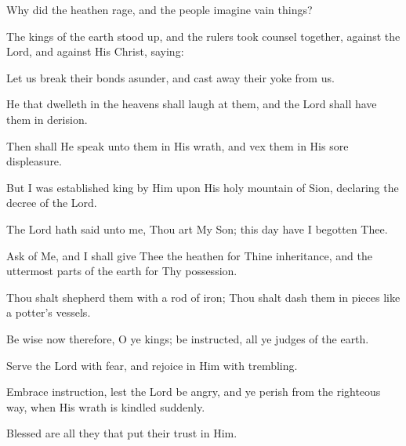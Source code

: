 Why did the heathen rage, and the people imagine vain things?

The kings of the earth stood up, and the rulers took counsel together, against the Lord, and against His Christ, saying:

Let us break their bonds asunder, and cast away their yoke from us.

He that dwelleth in the heavens shall laugh at them, and the Lord shall have them in derision.

Then shall He speak unto them in His wrath, and vex them in His sore displeasure.

But I was established king by Him upon His holy mountain of Sion, declaring the decree of the Lord.

The Lord hath said unto me, Thou art My Son; this day have I begotten Thee.

Ask of Me, and I shall give Thee the heathen for Thine inheritance, and the uttermost parts of the earth for Thy possession.

Thou shalt shepherd them with a rod of iron; Thou shalt dash them in pieces like a potter's vessels.

Be wise now therefore, O ye kings; be instructed, all ye judges of the earth.

Serve the Lord with fear, and rejoice in Him with trembling.

Embrace instruction, lest the Lord be angry, and ye perish from the righteous way, when His wrath is kindled suddenly.

Blessed are all they that put their trust in Him.
